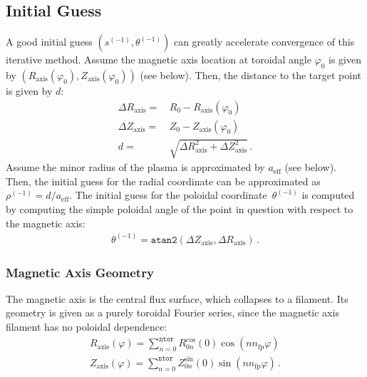 \FloatBarrier
\subsection{Initial Guess}
%
A good initial guess $(s^{(-1)}, \theta^{(-1)})$ can greatly accelerate convergence of this iterative method.
%
Assume the magnetic axis location at toroidal angle $\varphi_0$ is given by $(R_\textrm{axis}(\varphi_0), Z_\textrm{axis}(\varphi_0))$ (see below).
Then, the distance to the target point is given by $d$:
\begin{align}
 \Delta R_\textrm{axis} =&\, R_0 - R_\textrm{axis}(\varphi_0) \\
 \Delta Z_\textrm{axis} =&\, Z_0 - Z_\textrm{axis}(\varphi_0) \\
 d =&\, \sqrt{ \Delta R_\textrm{axis}^2 + \Delta Z_\textrm{axis}^2 } \, .
\end{align}
%
Assume the minor radius of the plasma is approximated by $a_\textrm{eff}$ (see below).
%
Then, the initial guess for the radial coordinate can be approximated as $\rho^{(-1)} = d / a_\textrm{eff}$.
%
The initial guess for the poloidal coordinate~$\theta^{(-1)}$ is computed
by computing the simple poloidal angle of the point in question
with respect to the magnetic axis:
\begin{align}
 \theta^{(-1)} = \texttt{atan2}(\Delta Z_\textrm{axis}, \Delta R_\textrm{axis}) \, .
\end{align}

\subsubsection{Magnetic Axis Geometry}
The magnetic axis is the central flux surface, which collapses to a filament.
%
Its geometry is given as a purely toroidal Fourier series,
since the magnetic axis filament has no poloidal dependence:
\begin{align}
 R_\textrm{axis}(\varphi) = \sum_{n=0}^{\texttt{ntor}} R^\textrm{cos}_{0n}(0) \cos(n n_\textrm{fp} \varphi) \label{eqn:axis_r} \\
 Z_\textrm{axis}(\varphi) = \sum_{n=0}^{\texttt{ntor}} Z^\textrm{sin}_{0n}(0) \sin(n n_\textrm{fp} \varphi) \label{eqn:axis_z} \, .
\end{align}


